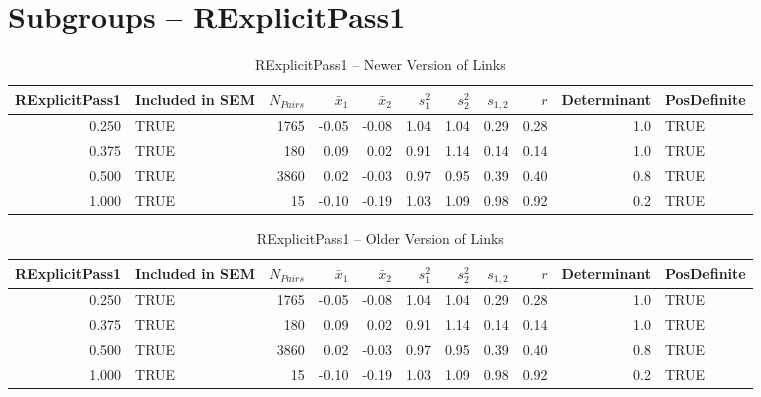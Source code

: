 \documentclass{article}\usepackage[]{graphicx}\usepackage[]{color}
\begin{document}
\section{Subgroups --  RExplicitPass1 }%
\begin{table}[ht]
\centering
\begin{tabular}{rlrrrrrrrrl}
  \hline
RExplicitPass1 & Included in SEM & $N_{Pairs}$ & $\bar{x}_1$ & $\bar{x}_2$ & $s_1^2$ & $s_2^2$ & $s_{1,2}$ & $r$ & Determinant & PosDefinite \\ 
  \hline
0.250 & TRUE & 1765 & -0.05 & -0.08 & 1.04 & 1.04 & 0.29 & 0.28 & 1.0 & TRUE \\ 
  0.375 & TRUE & 180 & 0.09 & 0.02 & 0.91 & 1.14 & 0.14 & 0.14 & 1.0 & TRUE \\ 
  0.500 & TRUE & 3860 & 0.02 & -0.03 & 0.97 & 0.95 & 0.39 & 0.40 & 0.8 & TRUE \\ 
  1.000 & TRUE & 15 & -0.10 & -0.19 & 1.03 & 1.09 & 0.98 & 0.92 & 0.2 & TRUE \\ 
   \hline
\end{tabular}
\caption{RExplicitPass1 -- Newer Version of Links} 
\end{table}
\begin{table}[ht]
\centering
\begin{tabular}{rlrrrrrrrrl}
  \hline
RExplicitPass1 & Included in SEM & $N_{Pairs}$ & $\bar{x}_1$ & $\bar{x}_2$ & $s_1^2$ & $s_2^2$ & $s_{1,2}$ & $r$ & Determinant & PosDefinite \\ 
  \hline
0.250 & TRUE & 1765 & -0.05 & -0.08 & 1.04 & 1.04 & 0.29 & 0.28 & 1.0 & TRUE \\ 
  0.375 & TRUE & 180 & 0.09 & 0.02 & 0.91 & 1.14 & 0.14 & 0.14 & 1.0 & TRUE \\ 
  0.500 & TRUE & 3860 & 0.02 & -0.03 & 0.97 & 0.95 & 0.39 & 0.40 & 0.8 & TRUE \\ 
  1.000 & TRUE & 15 & -0.10 & -0.19 & 1.03 & 1.09 & 0.98 & 0.92 & 0.2 & TRUE \\ 
   \hline
\end{tabular}
\caption{RExplicitPass1 -- Older Version of Links} 
\end{table}
\end{document}
